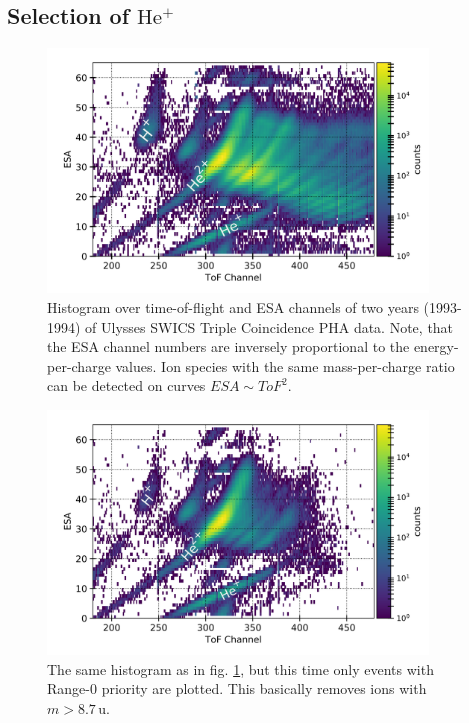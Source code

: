\subsection{Selection of $\mathrm{He^{+}}$}

\begin{figure}[h]
	\includegraphics[width=0.9\textwidth]{Figures/epq_all.png}
	\centering
	\caption{Histogram over time-of-flight and ESA channels of two years (1993-1994) of Ulysses SWICS Triple Coincidence PHA data. Note, that the ESA channel numbers are inversely proportional to the energy-per-charge values. Ion species with the same mass-per-charge ratio can be detected on curves $ESA \sim ToF^2$.}
	\label{fig:epq_all}
\end{figure}

\begin{figure}[h]
	\includegraphics[width=0.9\textwidth]{Figures/epq_rng0.png}
	\centering
	\caption{The same histogram as in fig. \ref{fig:epq_all}, but this time only events with Range-0 priority are plotted. This basically removes ions with $m>8.7\,\mathrm{u}$.}
	\label{fig:epq_rng0}
\end{figure}


